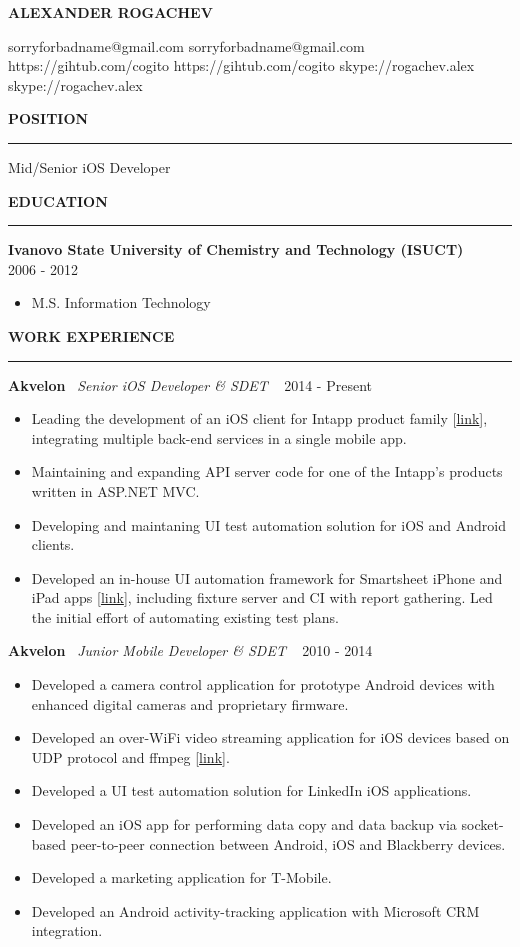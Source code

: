 ﻿\documentclass{article}
\newcommand*{\applicant}[1]{\gdef\applicanttext{#1}}
\newcommand*{\github}[1]{\gdef\githubtext{#1}}
\newcommand*{\email}[1]{\gdef\emailtext{#1}}
\newcommand*{\skype}[1]{\gdef\skypetext{#1}}
\renewcommand\maketitle{
  {\setstretch{1.2}
    \centerline{
       \textbf{\huge{\expandafter\MakeUppercase\expandafter{\applicanttext}}}
    }
    \begin{center}
      \ifdefined\emailtext
        \faEnvelopeO \hspace{0.1cm} \emailtext \hspace{0.1cm}
      \fi
      \ifdefined\githubtext
        \faGithub \hspace{0.1cm} \githubtext \hspace{0.1cm}
      \fi
      \ifdefined\skypetext
        \faSkype \hspace{0.1cm} \skypetext \hspace{0.1cm}

      \fi
      \ifdefined\linkedintext
        \faLinkedin \hspace{0.1cm} \linkedintext

      \fi
    \end{center}
  }
}
\newcommand{\cvsection}[1]{
  \vspace{2.6ex}
  \noindent\textbf{\large{\uppercase{#1}}}
  \vspace{1ex}
  \hrule
  \vspace{1.5ex}
}
\newcommand{\cvparagraph}[3]{
  \noindent\indent
  \textbf{#1}
  \ 
  \textit{#2}
  \ 
  \hfill{}
  {#3}\vspace{1ex}}
\newcommand{\cvlist}[1]{
  \begin{itemize}[topsep=0ex,leftmargin=*,itemsep=0ex,parsep=1ex,labelwidth=\parindent]
    #1
  \end{itemize}
}
\begin{document}
\pagestyle{fancy}
\fancyhf{}
\renewcommand{\headrulewidth}{0pt}

\applicant{Alexander Rogachev}
\github{https://gihtub.com/cogito}
\email{sorryforbadname@gmail.com}
\skype{skype://rogachev.alex}

\maketitle

\cvsection{Position}
Mid/Senior iOS Developer

\cvsection{Education}
\cvparagraph{Ivanovo State University of Chemistry and Technology (ISUCT)}{}{2006 - 2012}
\begin{itemize}[topsep=0ex,leftmargin=*]
  \item M.S. Information Technology
\end{itemize}

\cvsection{Work Experience}

\cvparagraph{Akvelon}{Senior iOS Developer \& SDET}{2014 - Present}
\cvlist{
  \item Leading the development of an iOS client for Intapp product family [\href{https://itunes.apple.com/us/app/intapp/id1052877767}{link}], integrating multiple back-end services in a single mobile app.
  \item Maintaining and expanding API server code for one of the Intapp's products written in ASP.NET MVC.
  \item Developing and maintaning UI test automation solution for iOS and Android clients.
  \item Developed an in-house UI automation framework for Smartsheet iPhone and iPad apps [\href{https://itunes.apple.com/us/app/smartsheet/id568421135}{link}], including fixture server and CI with report gathering. Led the initial effort of automating existing test plans.
}
\vspace{1ex}

\cvparagraph{Akvelon}{Junior Mobile Developer \& SDET}{2010 - 2014}
\cvlist{
  \item Developed a camera control application for prototype Android devices with enhanced digital cameras and proprietary firmware.
  \item Developed an over-WiFi video streaming application for iOS devices based on UDP protocol and ffmpeg [\href{http://neuronbeta.com/chirpglobal/chirpvision/app/}{link}].
  \item Developed a UI test automation solution for LinkedIn iOS applications.
  \item Developed an iOS app for performing data copy and data backup via socket-based peer-to-peer connection between Android, iOS and Blackberry devices.
  \item Developed a marketing application for T-Mobile.
  \item Developed an Android activity-tracking application with Microsoft CRM integration.
}
\end{document}
